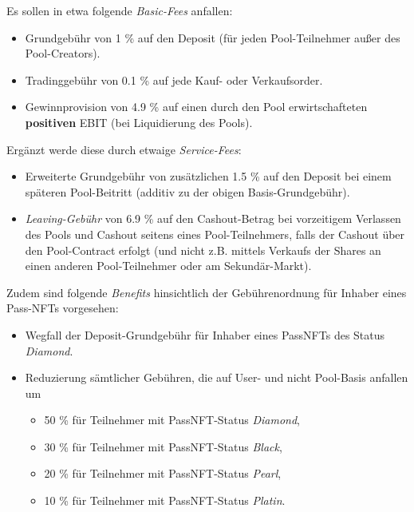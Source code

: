 \begin{Assumption}[Gebühren]\label{fees}

Es sollen in etwa folgende \textit{Basic-Fees} anfallen:

\begin{itemize}
	\item Grundgebühr von 1 \% auf den Deposit (für jeden Pool-Teilnehmer außer des Pool-Creators).
	\item Tradinggebühr von 0.1 \% auf jede Kauf- oder Verkaufsorder.
	\item Gewinnprovision von 4.9 \% auf einen durch den Pool erwirtschafteten \textbf{positiven} EBIT (bei Liquidierung des Pools).
\end{itemize}

\vspace{0.2cm}

Ergänzt werde diese durch etwaige \textit{Service-Fees}: 

\begin{itemize}
	\item Erweiterte Grundgebühr von zusätzlichen 1.5 \% auf den Deposit bei einem späteren Pool-Beitritt (additiv zu der obigen Basis-Grundgebühr).
	\item \textit{Leaving-Gebühr} von 6.9 \% auf den Cashout-Betrag bei vorzeitigem Verlassen des Pools und Cashout seitens eines Pool-Teilnehmers, falls der Cashout über den Pool-Contract erfolgt (und nicht z.B. mittels Verkaufs der Shares an einen anderen Pool-Teilnehmer oder am Sekundär-Markt).
\end{itemize}

\vspace{0.2cm}

Zudem sind folgende \textit{Benefits} hinsichtlich der Gebührenordnung für Inhaber eines Pass-NFTs  vorgesehen:

\begin{itemize}
	\item Wegfall der Deposit-Grundgebühr für Inhaber eines PassNFTs des Status \textit{Diamond}.
	\item Reduzierung sämtlicher Gebühren, die auf User- und nicht Pool-Basis anfallen um
	\begin{itemize}
		\item 50 \% für Teilnehmer mit PassNFT-Status \textit{Diamond},
		\item 30 \% für Teilnehmer mit PassNFT-Status \textit{Black},
		\item 20 \% für Teilnehmer mit PassNFT-Status \textit{Pearl},
		\item 10 \% für Teilnehmer mit PassNFT-Status \textit{Platin}.
	\end{itemize}
\end{itemize}


\end{Assumption}
